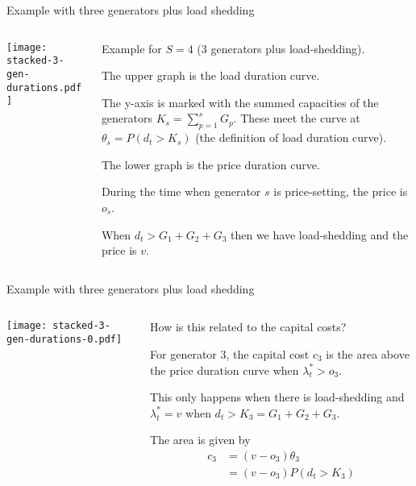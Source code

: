 \documentclass[10pt,aspectratio=169,dvipsnames]{beamer}
\def\l{\lambda}
\begin{document}
\begin{frame}{Example with three generators plus load shedding}

\begin{columns}[T]
  \begin{column}{6cm}

\texttt{[image: stacked-3-gen-durations.pdf]}

  \end{column}
  \begin{column}{8cm}
    Example for $S=4$ (3 generators plus load-shedding).

    \vspace{0.5cm}

    The upper graph is the load duration curve.

    The y-axis is marked with the summed capacities of the generators $K_s = \sum_{p=1}^s G_p$.
    These meet the curve at $\theta_s = P(d_t > K_s)$ (the definition of load duration curve).

    \vspace{1cm}

    The lower graph is the price duration curve.

    During the time when generator $s$ is price-setting, the price is $o_s$.

    When $d_t > G_1 + G_2 + G_3$ then we have load-shedding and the price is $v$.
  \end{column}

\end{columns}

\end{frame}


\begin{frame}{Example with three generators plus load shedding}

\begin{columns}[T]
  \begin{column}{6cm}

\texttt{[image: stacked-3-gen-durations-0.pdf]}

  \end{column}
  \begin{column}{8cm}

    How is this related to the capital costs?

    \vspace{0.5cm}

    For generator 3, the capital cost $c_3$ is the area above the price duration curve when $\l_t^* > o_3$.

    This only happens when there is load-shedding and $\l_t^* = v$ when $d_t > K_3 = G_1 + G_2 + G_3$.

    The area is given by
    \begin{align*}
      c_3 &  = (v - o_3) \theta_3  \\
      & = (v - o_3)P(d_t > K_3)
    \end{align*}
  \end{column}

\end{columns}

\end{frame}
\end{document}

